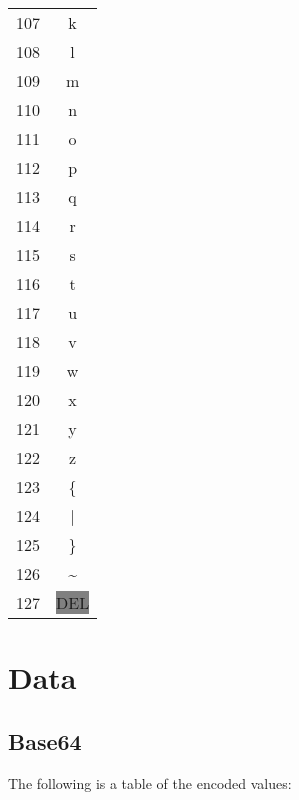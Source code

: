 {\begin{tabular}{c c}
  107 & k \\
  108 & l \\
  109 & m \\
  110 & n \\
  111 & o \\
  112 & p \\
  113 & q \\
  114 & r \\
  115 & s \\
  116 & t \\
  117 & u \\
  118 & v \\
  119 & w \\
  120 & x \\
  121 & y \\
  122 & z \\
  123 & \{ \\
  124 & | \\
  125 & \} \\
  126 & \textasciitilde \\
  127 & \colorbox{gray}{DEL} \\
\end{tabular}}

\newpage
\section{Data}

\subsection{Base64}

The following is a table of the encoded values:

